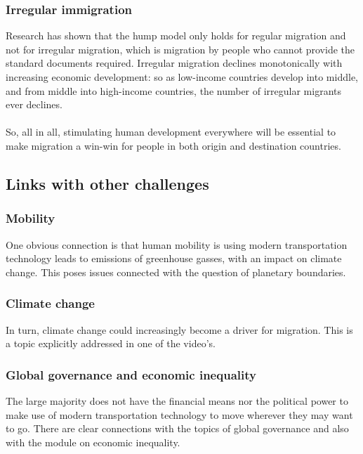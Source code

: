 \documentclass[../summary.tex]{subfiles}
\begin{document}
 	\subsubsection{Irregular immigration}
 	Research has shown that the hump model only holds for regular migration and not for irregular migration, which is migration by people who cannot provide the standard documents required. Irregular migration declines monotonically with increasing economic development: so as low-income countries develop into middle, and from middle into high-income countries, the number of irregular migrants ever declines.
 	\\
 	\\
 	So, all in all, stimulating human development everywhere will be essential to make migration a win-win for people in both origin and destination countries.
 	
 	\subsection{Links with other challenges}
 	\subsubsection{Mobility}
 	One obvious connection is that human mobility is using modern transportation technology leads to emissions of greenhouse gasses, with an impact on climate change. This poses issues connected with the question of planetary boundaries.
 	
 	\subsubsection{Climate change}
 	In turn, climate change could increasingly become a driver for migration. This is a topic explicitly addressed in one of the video's.
 	
 	\subsubsection{Global governance and economic inequality}
 	The large majority does not have the financial means nor the political power to make use of modern transportation technology to move wherever they may want to go. There are clear connections with the topics of global governance and also with the module on economic inequality.
 	
	
	
	
	
	
	
	
	
	
	
	
	
	
	 
	
	
\end{document}
